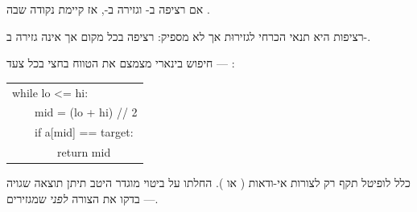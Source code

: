 \begin{thmbox}[frametitle={משפט הערך הממוצע}]
\small אם  רציפה ב-\en{$[a,b]$} וגזירה ב-, אז קיימת נקודה 
שבה .
\end{thmbox}
\medskip

\begin{notebox}[frametitle={הערה}]
\small רציפות היא תנאי הכרחי לגזירוּת אך לא מספיק:  רציפה בכל מקום אך אינה
גזירה ב-.
\end{notebox}
\medskip

\begin{exbox}[frametitle={דוגמה — \code{binary\_search}}]
\small חיפוש בינארי מצמצם את הטווח בחצי בכל צעד — :
\begin{otherlanguage}{english}\small\ttfamily
\begin{tabular}{@{}l@{}}
while lo <= hi:\\
\ \ \ \ mid = (lo + hi) // 2\\
\ \ \ \ if a[mid] == target:\\
\ \ \ \ \ \ \ \ return mid
\end{tabular}
\end{otherlanguage}
\end{exbox}
\medskip

\begin{warnbox}[frametitle={טעות נפוצה}]
\small כלל לופיטל תקף רק לצורות אי-ודאות ( או \en{$\infty/\infty$}). החלתו על ביטוי
מוגדר היטב תיתן תוצאה שגויה — בדקו את הצורה \emph{לפני} שמגזירים.
\end{warnbox}
\medskip

